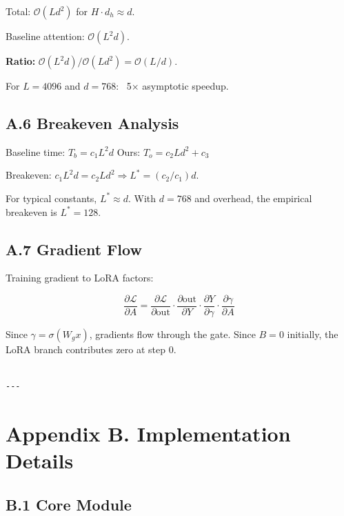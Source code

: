 Total: $\mathcal{O}(L d^2)$ for $H \cdot d_h \approx d$.

Baseline attention: $\mathcal{O}(L^2 d)$.

\textbf{Ratio:} $\mathcal{O}(L^2 d) / \mathcal{O}(L d^2) = \mathcal{O}(L/d)$.

For $L = 4096$ and $d = 768$: ~5$\times$ asymptotic speedup.

\subsection{A.6 Breakeven Analysis}

Baseline time: $T_b = c_1 L^2 d$
Ours: $T_o = c_2 L d^2 + c_3$

Breakeven: $c_1 L^2 d = c_2 L d^2 \Rightarrow L^* = (c_2/c_1) d$.

For typical constants, $L^* \approx d$. With $d = 768$ and overhead, the 
empirical breakeven is $L^* = 128$.

\subsection{A.7 Gradient Flow}

Training gradient to LoRA factors:

\[
\frac{\partial \mathcal{L}}{\partial A} = \frac{\partial \mathcal{L}}{\partial \text{out}} \cdot \frac{\partial \text{out}}{\partial Y} \cdot \frac{\partial Y}{\partial \gamma} \cdot \frac{\partial \gamma}{\partial A}
\tag{A.8}
\]

Since $\gamma = \sigma(W_g x)$, gradients flow through the gate. Since 
$B = 0$ initially, the LoRA branch contributes zero at step 0.
\begin{lstlisting}

---
\end{lstlisting}

\section{Appendix B. Implementation Details}

\subsection{B.1 Core Module}

